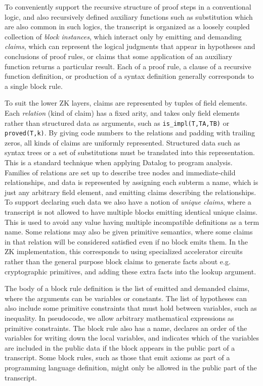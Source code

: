 \documentclass{article}
\theoremstyle{plain}
\theoremstyle{definition}
\begin{document}
To conveniently support the recursive structure of proof steps
in a conventional logic, and also recursively defined auxiliary functions
such as substitution which are also common in such logics,
the transcript is organized as a loosely coupled
collection of \emph{block instances}, which interact only by
emitting and demanding \emph{claims}, which can represent the
logical judgments that appear in hypotheses and conclusions of proof rules,
or claims that some application of an auxiliary function
returns a particular result.
Each of a proof rule, a clause of a recursive function definition, or
production of a syntax definition generally corresponds to a single
block rule.

To suit the lower ZK layers, claims are represented by tuples of field elements.
Each \emph{relation} (kind of claim) has a fixed arity, and takes
only field elements rather than structured data as arguments,
such as \texttt{is\_impl(T,TA,TB)} or
\texttt{proved(T,k)}.
By giving code numbers to the relations and padding with trailing
zeros, all kinds of claims are uniformly represented.
Structured data such as syntax trees or a set of
substitutions must be translated into this representation.
This is a standard technique when applying Datalog to program analysis.
Families of relations are set up to describe tree nodes and immediate-child
relationships, and data is represented by assigning each subterm a
name, which is just any arbitrary field element, and
emitting claims describing the relationships.
To support declaring such data we also have a notion of \emph{unique claims},
where a transcript is not allowed to have multiple blocks emitting identical
unique claims.
This is used to avoid any value having multiple incompatible
definitions as a term name.
Some relations may also be given primitive semantics, where some
claims in that relation will be considered satisfied even if no block
emits them.
In the ZK implementation, this corresponds to using specialized
accelerator circuits rather than the general purpose block claims
to generate facts about e.g. cryptographic primitives, and adding
these extra facts into the lookup argument.

The body of a block rule definition is the list of
emitted and demanded claims, where the arguments can be variables
or constants. The list of hypotheses can also include some
primitive constraints that must hold between variables, such
as inequality. In pseudocode, we allow arbitrary mathematical
expressions as primitive constraints.
The block rule also has a name, declares an order of the variables
for writing down the local variables, and indicates which of the
variables are included in the public data if the block appears
in the public part of a transcript.
Some block rules, such as those that emit axioms as part of
a programming language definition, might only be allowed in the public part
of the transcript.
\end{document}
